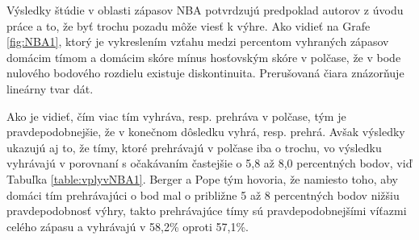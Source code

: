 \documentclass[
  digital, %
  oneside, %
  notable,   %
  lof,     %
  lot,     %
]{fithesis3}
\begin{document}
		Výsledky štúdie v oblasti zápasov NBA potvrdzujú predpoklad autorov z úvodu práce a to, že byť trochu pozadu môže viesť k výhre. Ako vidieť na Grafe \ref{fig:NBA1}, ktorý je vykreslením vzťahu medzi percentom vyhraných zápasov domácim tímom a domácim skóre mínus hosťovským skóre v polčase, že v bode nulového bodového rozdielu existuje diskontinuita. Prerušovaná čiara znázorňuje lineárny tvar dát. 
		
		Ako je vidieť, čím viac tím vyhráva, resp. prehráva v polčase, tým je pravdepodobnejšie, že v konečnom dôsledku vyhrá, resp. prehrá. Avšak výsledky ukazujú aj to, že tímy, ktoré prehrávajú v polčase iba o trochu, vo výsledku vyhrávajú v porovnaní s očakávaním častejšie o 5,8 až 8,0 percentných bodov, viď Tabuľka \ref{table:vplyvNBA1}. Berger a Pope tým hovoria, že namiesto toho, aby domáci tím prehrávajúci o bod mal o približne 5 až 8 percentných bodov nižšiu pravdepodobnosť výhry, takto prehrávajúce tímy sú pravdepodobnejšími víťazmi celého zápasu a vyhrávajú v 58,2\% oproti 57,1\%.
		
\end{document}
